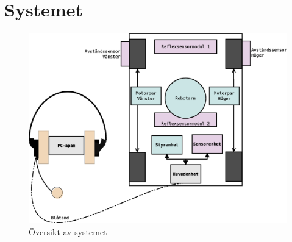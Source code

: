 
\section{Systemet}

\begin{figure}[h!]
	\centering
	\includegraphics[scale=0.4]{grafik/system-oversikt}
	\caption{Översikt av systemet}
\end{figure}
